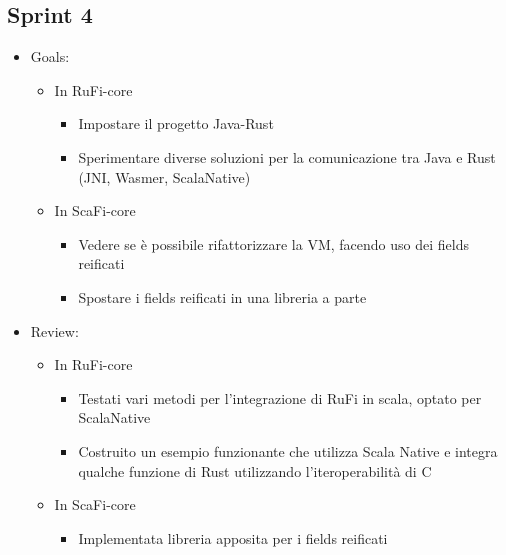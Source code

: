 \documentclass[12pt, a4paper]{article}
\begin{document}
\subsection*{Sprint 4}

\begin{itemize}
    \item Goals:
          \begin{itemize}
              \item In RuFi-core
                    \begin{itemize}
                        \item Impostare il progetto Java-Rust
                        \item Sperimentare diverse soluzioni per la comunicazione tra Java e Rust (JNI, Wasmer, ScalaNative)
                    \end{itemize}
              \item In ScaFi-core
                    \begin{itemize}
                        \item Vedere se è possibile rifattorizzare la VM, facendo uso dei fields reificati
                        \item Spostare i fields reificati in una libreria a parte
                    \end{itemize}
          \end{itemize}
    \item Review:
          \begin{itemize}
              \item In RuFi-core
                    \begin{itemize}
                        \item Testati vari metodi per l'integrazione di RuFi in scala, optato per ScalaNative
                        \item Costruito un esempio funzionante che utilizza Scala Native e integra qualche funzione di Rust utilizzando l'iteroperabilità di C
                    \end{itemize}
              \item In ScaFi-core
                    \begin{itemize}
                        \item Implementata libreria apposita per i fields reificati
                    \end{itemize}
          \end{itemize}
\end{itemize}
\end{document}

